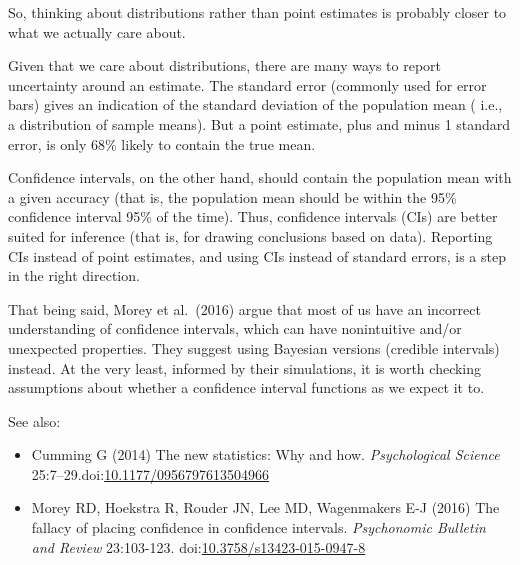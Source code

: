 \documentclass[letterpaper,oneside,11pt,article, portrait]{memoir}
\newcommand{\doi}[1]{doi:\href{http://dx.doi.org/#1}{#1}}
\newcommand{\journal}[1]{\textit{#1}} 			%
\begin{document}
So, thinking about distributions rather than point estimates is probably closer to what we actually care about.

Given that we care about distributions, there are many ways to report uncertainty around an estimate. The standard error (commonly used for error bars) gives an indication of the standard deviation of the population mean ( i.e., a distribution of sample means). But a point estimate, plus and minus 1 standard error, is only 68\% likely to contain the true mean.

Confidence intervals, on the other hand, should contain the population mean with a given accuracy (that is, the population mean should be within the 95\% confidence interval 95\% of the time). Thus, confidence intervals (CIs) are better suited for inference (that is, for drawing conclusions based on data). Reporting CIs instead of point estimates, and using CIs instead of standard errors, is a step in the right direction.

That being said, Morey et al.\ (2016) argue that most of us have an incorrect understanding of confidence intervals, which can have nonintuitive and/or unexpected properties. They suggest using Bayesian versions (credible intervals) instead. At the very least, informed by their simulations, it is worth checking assumptions about whether a confidence interval functions as we expect it to.

\vspace{1em} \noindent See also:

\begin{itemize}
\item Cumming G (2014) The new statistics: Why and how. \journal{Psychological Science} 25:7--29.\newline \doi{10.1177/0956797613504966}

\item Morey RD, Hoekstra R, Rouder JN, Lee MD, Wagenmakers E-J (2016) The fallacy of placing confidence in confidence intervals. \journal{Psychonomic Bulletin and Review} 23:103-123. \doi{10.3758/s13423-015-0947-8}


\end{itemize}
\end{document}
